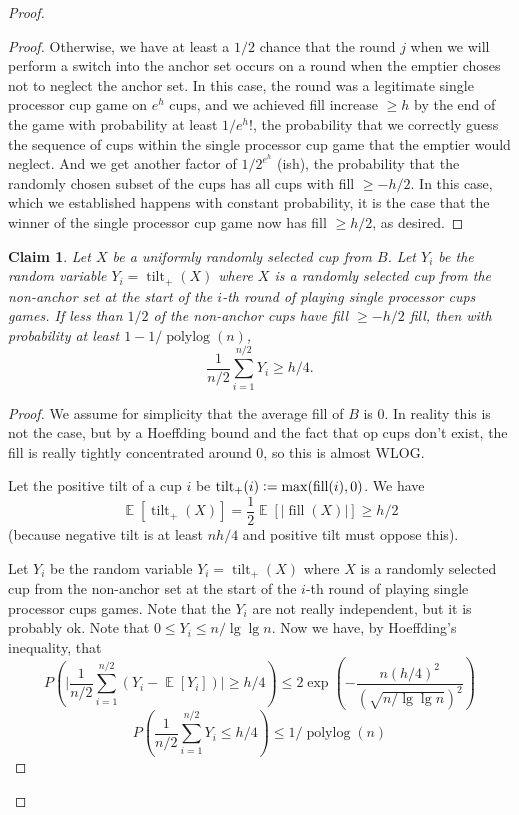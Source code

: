 \documentclass[twocolumn]{article}[11pt]
\DeclareMathOperator{\E}{\mathbb{E}}
\DeclareMathOperator{\polylog}{\text{polylog}}
\DeclareMathOperator{\tilt}{\text{tilt}}
\DeclareMathOperator{\fil}{\text{fill}}
\newcommand{\defeq}{\vcentcolon=}
\newtheorem{clm}{Claim}
\begin{document}
\begin{proof}
\begin{proof}
  Otherwise, we have at least a $1/2$ chance that the round $j$ when we will
  perform a switch into the anchor set occurs on a round when the emptier choses 
  not to neglect the anchor set. In this case, the round was a legitimate
  single processor cup game on $e^h$ cups, and we achieved fill increase $\ge
  h$ by the end of the game with probability at least $1/e^h!$, the probability
  that we correctly guess the sequence of cups within the single processor cup
  game that the emptier would neglect. And we get another factor of $1/2^{e^h}$
  (ish), the probability that the randomly chosen subset of the cups has all
  cups with fill $\ge -h/2$. In this case, which we established happens with
  constant probability, it is the case that the winner of the single processor
  cup game now has fill $\ge h/2$, as desired.
\end{proof}

\begin{clm}
  \label{clm:xtreme}
  Let $X$ be a uniformly randomly selected cup from $B$.
  Let $Y_i$ be the random variable $Y_i=\tilt_+(X)$ where $X$ is a randomly
  selected cup from the non-anchor set at the start of the $i$-th round of
  playing single processor cups games. 
  If less than $1/2$ of the non-anchor cups have fill $\ge -h/2$ fill, then
  with probability at least $1- 1/\polylog(n)$,
  $$\frac{1}{n/2}\sum_{i=1}^{n/2} Y_i \ge h/4.$$
\end{clm}

\begin{proof}
  We assume for simplicity that the average fill of $B$ is $0$. In reality this
  is not the case, but by a Hoeffding bound and the fact that op cups don't
  exist, the fill is really tightly concentrated around $0$, so this is almost
  WLOG.

  Let the positive tilt of a cup $i$ be $\tilt_+(i) \defeq \max(\fil(i), 0)$.
  We have
  $$\E[\tilt_+(X)] = \frac{1}{2}\E[|\fil(X)|] \ge h/2$$
  (because negative tilt is at least $nh/4$ and positive tilt must oppose this).
  
  Let $Y_i$ be the random variable $Y_i=\tilt_+(X)$ where $X$ is a randomly
  selected cup from the non-anchor set at the start of the $i$-th round of
  playing single processor cups games. Note that the $Y_i$ are not really
  independent, but it is probably ok. Note that $0\le Y_i \le n/\lg\lg n$.
  Now we have, by Hoeffding's inequality, that 
  $$P\left(\Big|\frac{1}{n/2} \sum_{i=1}^{n/2} (Y_i - \E[Y_i])\Big|\ge h/4
  \right) \le 2\exp\left(-\frac{n(h/4)^2}{(\sqrt{n/\lg\lg n})^2}\right) $$
  $$P\left(\frac{1}{n/2}\sum_{i=1}^{n/2} Y_i \le h/4\right) \le 1/\polylog(n) $$


\end{proof}
\end{proof}
\end{document}
